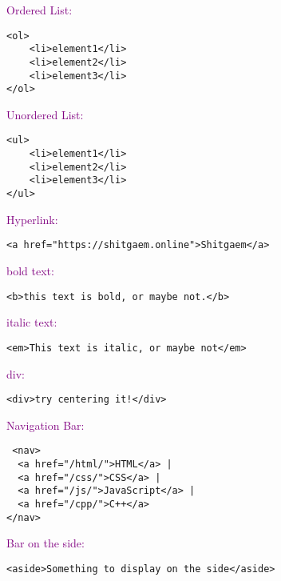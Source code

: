 \documentclass[main.tex,fontsize=6pt,paper=a4,paper=landscape,DIV=calc,]{scrartcl}
\begin{document}
\begin{multicols*}{4}
\textcolor{purple}{Ordered List:}
\vspace{-2mm}
\begin{lstlisting}
<ol>
    <li>element1</li>
    <li>element2</li>
    <li>element3</li>
</ol>
\end{lstlisting}
\vspace{2mm}

\textcolor{purple}{Unordered List:}
\vspace{-2mm}
\begin{lstlisting}
<ul>
    <li>element1</li>
    <li>element2</li>
    <li>element3</li>
</ul>
\end{lstlisting}
\vspace{2mm}

\textcolor{purple}{Hyperlink:}
\vspace{-2mm}
\begin{lstlisting}
<a href="https://shitgaem.online">Shitgaem</a>
\end{lstlisting}
\vspace{2mm}

\textcolor{purple}{bold text:}
\vspace{-2mm}
\begin{lstlisting}
<b>this text is bold, or maybe not.</b>
\end{lstlisting}
\vspace{2mm}

\textcolor{purple}{italic text:}
\vspace{-2mm}
\begin{lstlisting}
<em>This text is italic, or maybe not</em>
\end{lstlisting}
\vspace{2mm}

\textcolor{purple}{div:}
\vspace{-2mm}
\begin{lstlisting}
<div>try centering it!</div>
\end{lstlisting}
\vspace{2mm}

\textcolor{purple}{Navigation Bar:}
\vspace{-2mm}
\begin{lstlisting}
 <nav>
  <a href="/html/">HTML</a> |
  <a href="/css/">CSS</a> |
  <a href="/js/">JavaScript</a> |
  <a href="/cpp/">C++</a>
</nav>
\end{lstlisting}
\vspace{2mm}

\textcolor{purple}{Bar on the side:}
\vspace{-2mm}
\begin{lstlisting}
<aside>Something to display on the side</aside>
\end{lstlisting}
\vspace{2mm}


\end{multicols*}
\end{document}
